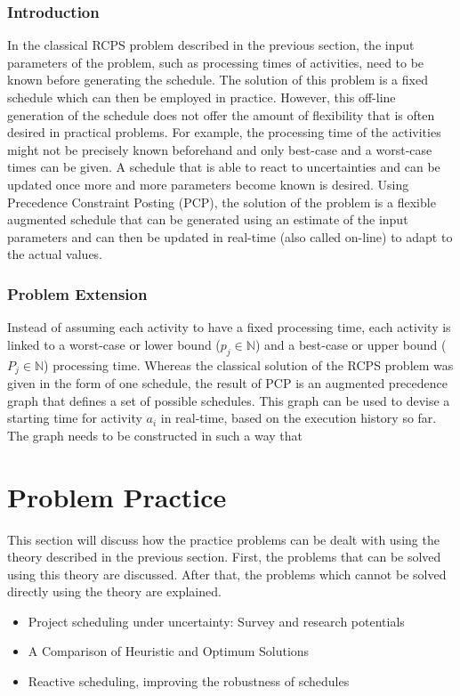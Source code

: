 \documentclass{article}
\begin{document}
\subsubsection{Introduction}
In the classical RCPS problem described in the previous section, the input parameters of the problem, such as processing times of activities, need to be known before generating the schedule. The solution of this problem is a fixed schedule which can then be employed in practice. However, this off-line generation of the schedule does not offer the amount of flexibility that is often desired in practical problems. For example, the processing time of the activities might not be precisely known beforehand and only best-case and a worst-case times can be given. A schedule that is able to react to uncertainties and can be updated once more and more parameters become known is desired. Using Precedence Constraint Posting (PCP), the solution of the problem is a flexible augmented schedule that can be generated using an estimate of the input parameters and can then be updated in real-time (also called on-line) to adapt to the actual values.

\subsubsection{Problem Extension}
Instead of assuming each activity to have a fixed processing time, each activity is linked to a worst-case or lower bound ($p_{j} \in \mathbb{N}$) and a best-case or upper bound ($P_{j} \in \mathbb{N}$) processing time. Whereas the classical solution of the RCPS problem was given in the form of one schedule, the result of PCP is an augmented precedence graph that defines a set of possible schedules. This graph can be used to devise a starting time for activity $a_i$ in real-time, based on the execution history so far. The graph needs to be constructed in such a way that 


\section{Problem Practice}
This section will discuss how the practice problems can be dealt with using the theory described in the previous section. First, the problems that can be solved using this theory are discussed. After that, the problems which cannot be solved directly using the theory are explained.\\

\begin{itemize}
\item Project scheduling under uncertainty: Survey
and research potentials
\item A Comparison of Heuristic and Optimum Solutions
\item Reactive scheduling, improving the robustness of schedules
\end{itemize}
\end{document}
